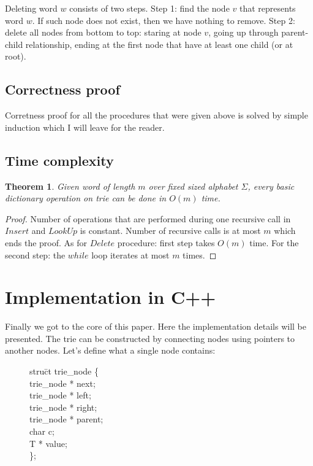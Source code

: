 \documentclass[a4paper,12pt]{article}
\newtheorem{theo}[defi]{Theorem}
\begin{document}
Deleting word $w$ consists of two steps. Step 1: find the node $v$ that represents word $w$. If such node does not exist, then we have nothing to remove. Step 2: delete all nodes from bottom to top: staring at node $v$, going up through parent-child relationship, ending at the first node that have at least one child (or at root).

\subsection{Correctness proof}

Corretness proof for all the procedures that were given above is solved by simple induction which I will leave for the reader.

\subsection{Time complexity}

\begin{theo}
Given word of length $m$ over fixed sized alphabet $\Sigma$, every basic dictionary operation on trie can be done in $O(m)$ time.
\end{theo}

\begin{proof}
Number of operations that are performed during one recursive call in $Insert$ and $LookUp$ is constant. Number of recursive calls is at most $m$ which ends the proof. As for $Delete$ procedure: first step takes $O(m)$ time. For the second step: the $while$ loop iterates at most $m$ times. \qedhere
\end{proof}


\section{Implementation in C++}

Finally we got to the core of this paper. Here the implementation details will be presented. The trie can be constructed by connecting nodes using pointers to another nodes. Let's define what a single node contains:

\begin{figure}[!htb]
\begin{tabbing}
stru\=ct trie\_node \{ \\
\>    trie\_node * next; \\
\>    trie\_node * left; \\
\>    trie\_node * right; \\
\>    trie\_node * parent; \\
\>		char c;	\\ 
\>		T * value; \\
\};
\end{tabbing}
\end{figure}
\end{document}

